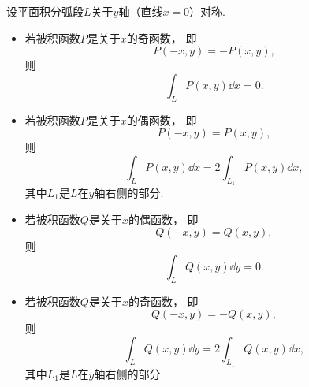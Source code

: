 设平面积分弧段\(L\)关于\(y\)轴（直线\(x=0\)）对称.
\begin{itemize}
	\item 若被积函数\(P\)是关于\(x\)的奇函数，
	即\begin{equation*}
		P(-x,y) = -P(x,y),
	\end{equation*}
	则\begin{equation*}
		\int_L P(x,y) \dd{x} = 0.
	\end{equation*}

	\item 若被积函数\(P\)是关于\(x\)的偶函数，
	即\begin{equation*}
		P(-x,y) = P(x,y),
	\end{equation*}
	则\begin{equation*}
		\int_L P(x,y) \dd{x} = 2\int_{L_1} P(x,y) \dd{x},
	\end{equation*}
	其中\(L_1\)是\(L\)在\(y\)轴右侧的部分.

	\item 若被积函数\(Q\)是关于\(x\)的偶函数，
	即\begin{equation*}
		Q(-x,y) = Q(x,y),
	\end{equation*}
	则\begin{equation*}
		\int_L Q(x,y) \dd{y} = 0.
	\end{equation*}

	\item 若被积函数\(Q\)是关于\(x\)的奇函数，
	即\begin{equation*}
		Q(-x,y) = -Q(x,y),
	\end{equation*}
	则\begin{equation*}
		\int_L Q(x,y) \dd{y} = 2\int_{L_1} Q(x,y) \dd{x},
	\end{equation*}
	其中\(L_1\)是\(L\)在\(y\)轴右侧的部分.
\end{itemize}
